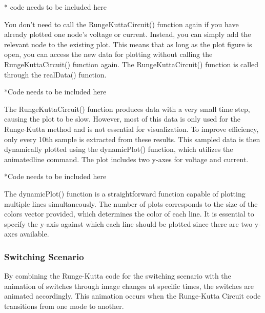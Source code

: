 * code needs to be included here

You don't need to call the RungeKuttaCircuit() function again if you have already plotted one node's voltage or current. Instead, you can simply add the relevant node to the existing plot. This means that as long as the plot figure is open, you can access the new data for plotting without calling the RungeKuttaCircuit() function again. The RungeKuttaCircuit() function is called through the realData() function.

*Code needs to be included here

The RungeKuttaCircuit() function produces data with a very small time step, causing the plot to be slow. However, most of this data is only used for the Runge-Kutta method and is not essential for visualization. To improve efficiency, only every 10th sample is extracted from these results. This sampled data is then dynamically plotted using the dynamicPlot() function, which utilizes the animatedline command. The plot includes two y-axes for voltage and current.

*Code needs to be included here

The dynamicPlot() function is a straightforward function capable of plotting multiple lines simultaneously. The number of plots corresponds to the size of the colors vector provided, which determines the color of each line. It is essential to specify the y-axis against which each line should be plotted since there are two y-axes available.

\subsubsection{Switching Scenario}

By combining the Runge-Kutta code for the switching scenario with the animation of switches through image changes at specific times, the switches are animated accordingly. This animation occurs when the Runge-Kutta Circuit code transitions from one mode to another.